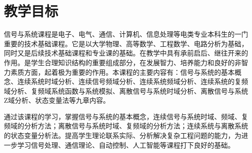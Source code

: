 \documentclass[letterpaper]{article}
\begin{document}
\section*{\textsc{教学目标}}
\quad\quad 信号与系统课程是电子、电气、通信、计算机、信息处理等电类专业本科生的一门重要的技术基础课程。它是以大学物理、高等数学、工程数学、电路分析为基础，同时又是后续技术基础课程和专业课的基础。在教学中具有承前启后、继往开来的作用。是学生合理知识结构的重要组成部分，在发展智力、培养能力和良好的非智力素质方面，起着极为重要的作用。本课程的主要内容有：信号与系统的基本概念、连续系统时域分析、连续信号频域分析、连续系统频域分析、连续系统的复频域分析、复频域系统函数与系统模拟、离散信号与系统时域分析、离散信号与系统Z域分析、状态变量法等九章内容。\par
\quad\quad 通过该课程的学习，掌握信号与系统的基本概念，连续信号与系统时域、频域、复频域的分析方法；离散信号与系统时域、复频域的分析方法；连续系统与离散系统的状态变量分析法。提高学生理论联系实际、分析解决复杂工程问题的能力，为进一步学习信号处理、通信理论、自动控制、人工智能等课程打下良好的基础。

\end{document}
